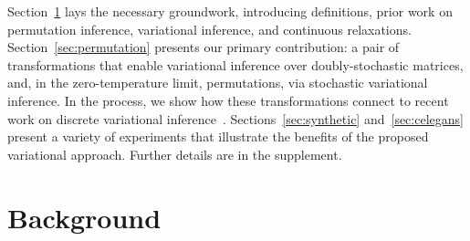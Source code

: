 \documentclass[twoside]{article}
\begin{document}
Section~\ref{sec:background} lays the necessary groundwork,
introducing definitions, prior work on permutation inference,
variational inference, and continuous relaxations.
Section~\ref{sec:permutation} presents our primary contribution: a
pair of transformations that enable variational inference over
doubly-stochastic matrices, and, in the zero-temperature limit,
permutations, via stochastic variational inference.  In the process,
we show how these transformations connect to recent work on discrete
variational inference~\citep{maddison2016concrete,
  jang2016categorical}.  Sections~\ref{sec:synthetic}
and~\ref{sec:celegans} present a variety of experiments that
illustrate the benefits of the proposed variational approach.
Further details are in the supplement.
  
\section{Background}
\label{sec:background}

\end{document}
